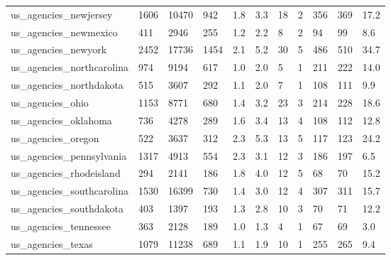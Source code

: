 \begin{longtable}{lllllllllll}
 us\_agencies\_newjersey                              & 1606       & 10470     & 942   & 1.8    & 3.3    & 18    & 2      & 356    & 369    & 17.2    \\
 us\_agencies\_newmexico                              & 411        & 2946      & 255   & 1.2    & 2.2    & 8     & 2      & 94     & 99     & 8.6     \\
 us\_agencies\_newyork                                & 2452       & 17736     & 1454  & 2.1    & 5.2    & 30    & 5      & 486    & 510    & 34.7    \\
 us\_agencies\_northcarolina                          & 974        & 9194      & 617   & 1.0    & 2.0    & 5     & 1      & 211    & 222    & 14.0    \\
 us\_agencies\_northdakota                            & 515        & 3607      & 292   & 1.1    & 2.0    & 7     & 1      & 108    & 111    & 9.9     \\
 us\_agencies\_ohio                                   & 1153       & 8771      & 680   & 1.4    & 3.2    & 23    & 3      & 214    & 228    & 18.6    \\
 us\_agencies\_oklahoma                               & 736        & 4278      & 289   & 1.6    & 3.4    & 13    & 4      & 108    & 112    & 12.8    \\
 us\_agencies\_oregon                                 & 522        & 3637      & 312   & 2.3    & 5.3    & 13    & 5      & 117    & 123    & 24.2    \\
 us\_agencies\_pennsylvania                           & 1317       & 4913      & 554   & 2.3    & 3.1    & 12    & 3      & 186    & 197    & 6.5     \\
 us\_agencies\_rhodeisland                            & 294        & 2141      & 186   & 1.8    & 4.0    & 12    & 5      & 68     & 70     & 15.2    \\
 us\_agencies\_southcarolina                          & 1530       & 16399     & 730   & 1.4    & 3.0    & 12    & 4      & 307    & 311    & 15.7    \\
 us\_agencies\_southdakota                            & 403        & 1397      & 193   & 1.3    & 2.8    & 10    & 3      & 70     & 71     & 12.2    \\
 us\_agencies\_tennessee                              & 363        & 2128      & 189   & 1.0    & 1.3    & 4     & 1      & 67     & 69     & 3.0     \\
 us\_agencies\_texas                                  & 1079       & 11238     & 689   & 1.1    & 1.9    & 10    & 1      & 255    & 265    & 9.4     \\

\end{longtable}
